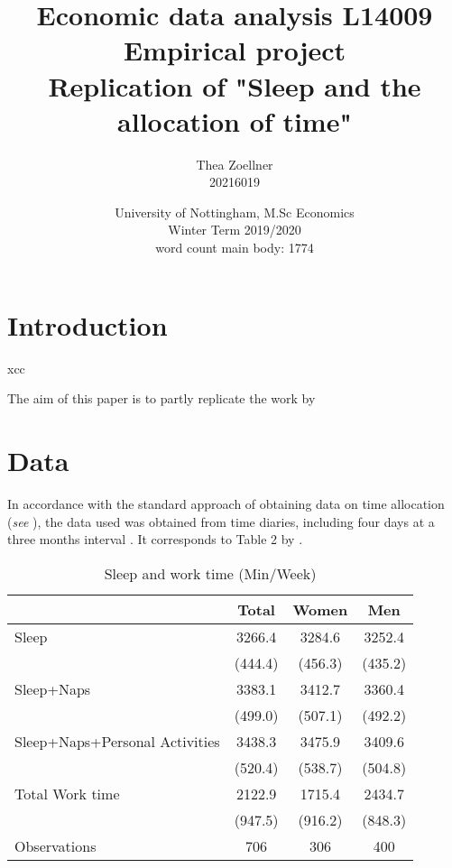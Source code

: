 \documentclass[12pt]{article}%
\title{Economic data analysis L14009 \\
Empirical project \\
Replication of "Sleep and the allocation of time"}
\author{Thea Zoellner\\20216019}
\date{University of Nottingham, M.Sc Economics\\Winter Term 2019/2020 \\ 
word count main body: 1774}
\begin{document}
\maketitle
\thispagestyle{empty}



\newpage

\tableofcontents
\listoftables


\newpage
\section{Introduction}

xcc

The aim of this paper is to partly replicate the work by \citet{biddle1990sleep} 

\section{Data}
In accordance with the standard approach of obtaining data on time allocation (\textit{see} \citep{juster1991allocation}), the data used was obtained from time diaries, including four days at a three months interval \citep[p.~926]{biddle1990sleep}. It corresponds to Table 2 by \citet[p.~927]{biddle1990sleep}. 


\begin{table}[htbp]\centering
\caption{Sleep and work time (Min/Week)\label{tab1}}
\begin{tabular}{l*{3}{c}}
\hline\hline
                    &\multicolumn{1}{c}{Total}&\multicolumn{1}{c}{Women}&\multicolumn{1}{c}{Men}\\
\hline
Sleep               &      3266.4&      3284.6&      3252.4\\
                    &     (444.4)&     (456.3)&     (435.2)\\
[1em]
Sleep+Naps          &      3383.1&      3412.7&      3360.4\\
                    &     (499.0)&     (507.1)&     (492.2)\\
[1em]
Sleep+Naps+Personal Activities&      3438.3&      3475.9&      3409.6\\
                    &     (520.4)&     (538.7)&     (504.8)\\
[1em]
Total Work time      &      2122.9&      1715.4&      2434.7\\
                    &     (947.5)&     (916.2)&     (848.3)\\
\hline
Observations        &         706&         306&         400\\
\hline\hline
\end{tabular}
\end{table}
\end{document}
